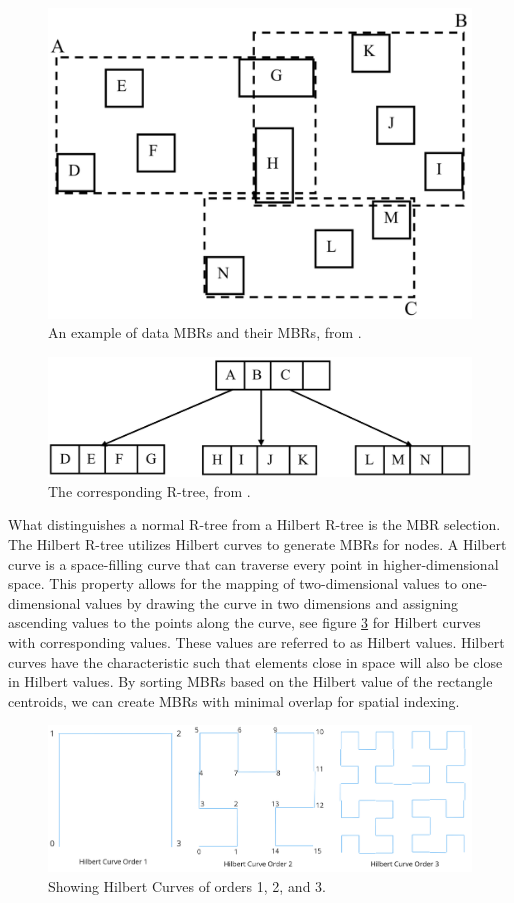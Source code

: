 \begin{figure}
    \centering
    \includegraphics[width=0.5\linewidth]{./figures/mbrs.png}
    \caption{An example of data MBRs and their MBRs, from \cite{rtree}.}
    \label{fig:mbrs}
\end{figure}
\begin{figure}
    \centering
    \includegraphics[width=\linewidth]{./figures/rtree.png}
    \caption{The corresponding R-tree, from \cite{rtree}.}
    \label{fig:rtree}
\end{figure}

What distinguishes a normal R-tree from a Hilbert R-tree is the MBR selection. The Hilbert R-tree utilizes Hilbert curves to generate MBRs for nodes. A Hilbert curve is a space-filling curve that can traverse every point in higher-dimensional space. This property allows for the mapping of two-dimensional values to one-dimensional values by drawing the curve in two dimensions and assigning ascending values to the points along the curve, see figure \ref{fig:hilbert} for Hilbert curves with corresponding values. These values are referred to as Hilbert values. Hilbert curves have the characteristic such that elements close in space will also be close in Hilbert values. By sorting MBRs based on the Hilbert value of the rectangle centroids, we can create MBRs with minimal overlap for spatial indexing.

\begin{figure}[t]
    \centering
    \includegraphics[width=\linewidth]{./figures/hilbert_orders.png}
    \caption{Showing Hilbert Curves of orders 1, 2, and 3.}
    \label{fig:hilbert}
\end{figure}

